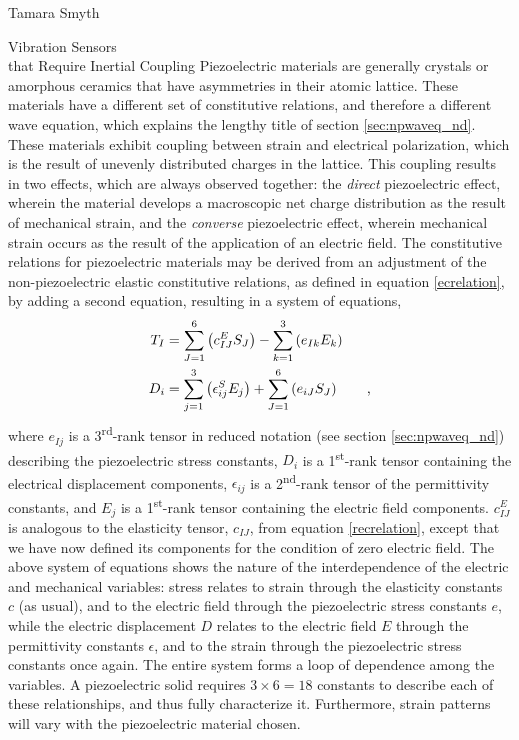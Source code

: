 \documentclass[a4paper,10pt]{report}
\numberwithin{equation}{section}
\begin{document}
\begin{chapter}{Tamara Smyth}
\begin{section}{Vibration Sensors \\that Require Inertial Coupling}
Piezoelectric materials are generally crystals or amorphous ceramics that have asymmetries in their atomic lattice. \cite[p.~17]{Kino1987} These materials have a different set of constitutive relations, and therefore a different wave equation, which explains the lengthy title of section \ref{sec:npwaveq_nd}. These materials exhibit coupling between strain and electrical polarization, which is the result of unevenly distributed charges in the lattice. This coupling results in two effects, which are always observed together: the \emph{direct} piezoelectric effect, wherein the material develops a macroscopic net charge distribution as the result of mechanical strain, and the \emph{converse} piezoelectric effect, wherein mechanical strain occurs as the result of the application of an electric field. \cite[p.~23]{Ballantine1997} The constitutive relations for piezoelectric materials may be derived from an adjustment of the non-piezoelectric elastic constitutive relations, as defined in equation \eqref{ecrelation},
 by adding a second equation, resulting in a system of equations\cite[p.~24]{Ballantine1997},
\begin{align}\label{pecrelation}
T_I &= \sum_{J=1}^6 \left( c_{IJ}^E S_J \right)- \sum_{k=1}^3 \left( e_{Ik}E_k \right) \notag\\
D_i &= \sum_{j = 1}^3 \left( \epsilon_{ij}^S E_j \right) + \sum_{J = 1}^6 \left( e_{iJ} S_J \right) \qquad \text{,}
\end{align}
where $e_{Ij}$ is a 3\textsuperscript{rd}-rank tensor in reduced notation (see section \ref{sec:npwaveq_nd}) describing the piezoelectric stress constants, $D_i$ is a 1\textsuperscript{st}-rank tensor containing the electrical displacement components, $\epsilon_{ij}$ is a 2\textsuperscript{nd}-rank tensor of the permittivity constants, and $E_j$ is a 1\textsuperscript{st}-rank tensor containing the electric field components. \cite[p.~24]{Ballantine1997}$c_{IJ}^E$ is analogous to the elasticity tensor, $c_{IJ}$, from equation \eqref{recrelation}, except that we have now defined its components for the condition of zero electric field. \cite[p.~19]{Kino1987} The above system of equations shows the nature of the interdependence of the electric and mechanical variables: stress relates to strain through the elasticity constants $c$ (as usual), and to the electric field through the piezoelectric stress constants $e$, while the electric displacement $D$ relates to the electric field $E$ through the permittivity 
constants $\epsilon$, and to the strain through the piezoelectric stress constants once again. The entire system forms a loop of dependence among the variables. A piezoelectric solid requires $3\times6 = 18$ constants to describe each of these relationships, and thus fully characterize it. Furthermore, strain patterns will vary with the piezoelectric material chosen. \cite[p.~24]{Ballantine1997}


\end{section}
\end{chapter}
\end{document}
